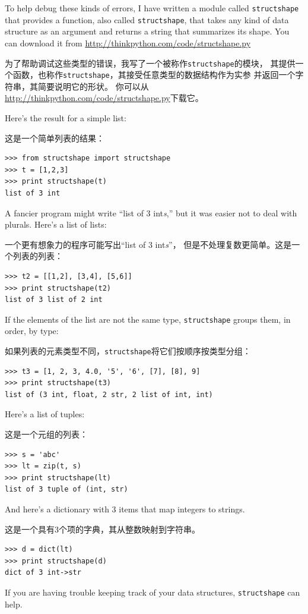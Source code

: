 \documentclass[10pt]{book}
\begin{document}
\begin{CJK}{UTF8}{gbsn}

To help debug these kinds of errors, I have written a module
called {\tt structshape} that provides a function, also called
{\tt structshape}, that takes any kind of data structure as
an argument and returns a string that summarizes its shape.
You can download it from \url{http://thinkpython.com/code/structshape.py}

为了帮助调试这些类型的错误，我写了一个被称作{\tt structshape}的模块，
其提供一个函数，也称作{\tt structshape}，其接受任意类型的数据结构作为实参
并返回一个字符串，其简要说明它的形状。
你可以从\url{http://thinkpython.com/code/structshape.py}下载它。

Here's the result for a simple list:

这是一个简单列表的结果：

\begin{verbatim}
>>> from structshape import structshape
>>> t = [1,2,3]
>>> print structshape(t)
list of 3 int
\end{verbatim}
%
A fancier program might write ``list of 3 int{\em s},'' but it
was easier not to deal with plurals.  Here's a list of lists:

一个更有想象力的程序可能写出``list of 3 int{\em s}''，
但是不处理复数更简单。这是一个列表的列表：

\begin{verbatim}
>>> t2 = [[1,2], [3,4], [5,6]]
>>> print structshape(t2)
list of 3 list of 2 int
\end{verbatim}
%
If the elements of the list are not the same type,
{\tt structshape} groups them, in order, by type:

如果列表的元素类型不同，{\tt structshape}将它们按顺序按类型分组：

\begin{verbatim}
>>> t3 = [1, 2, 3, 4.0, '5', '6', [7], [8], 9]
>>> print structshape(t3)
list of (3 int, float, 2 str, 2 list of int, int)
\end{verbatim}
%
Here's a list of tuples:

这是一个元组的列表：

\begin{verbatim}
>>> s = 'abc'
>>> lt = zip(t, s)
>>> print structshape(lt)
list of 3 tuple of (int, str)
\end{verbatim}
%
And here's a dictionary with 3 items that map integers to strings.

这是一个具有3个项的字典，其从整数映射到字符串。

\begin{verbatim}
>>> d = dict(lt) 
>>> print structshape(d)
dict of 3 int->str
\end{verbatim}
%
If you are having trouble keeping track of your data structures,
{\tt structshape} can help.


\end{CJK}
\end{document}
